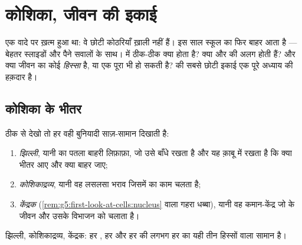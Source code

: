 \chapter{कोशिका, जीवन की इकाई}\label{ch:g6:cell-unit-of-life}

 एक वादे पर ख़त्म हुआ था: वे छोटी
कोठरियाँ ख़ाली नहीं हैं। इस साल स्कूल का  फिर बाहर आता है
--- बेहतर स्लाइडों और पैने सवालों के साथ।  में ठीक-ठीक क्या होता
है? क्या  और  की  अलग होती हैं? और क्या  जीवन का
कोई \emph{हिस्सा} है, या एक  पूरा  भी हो सकती है?
 की सबसे छोटी इकाई एक पूरे अध्याय की हक़दार है।

\section{कोशिका के भीतर}

\begin{definition}[कोशिका के भाग]\label{def:g6:cell-unit-of-life:parts}
ठीक से देखो तो हर  वही बुनियादी साज़-सामान दिखाती है:
\begin{enumerate}
  \item \emph{झिल्ली}, यानी  का पतला बाहरी लिफ़ाफ़ा,
        जो उसे बाँधे रखता है और यह क़ाबू में रखता है कि क्या भीतर आए और
        क्या बाहर जाए;
  \item \emph{कोशिकाद्रव्य}, यानी वह लसलसा भराव
        जिसमें  का काम चलता है;
  \item \emph{केंद्रक}
        (\cref{rem:g5:first-look-at-cells:nucleus} वाला गहरा धब्बा),
        यानी वह कमान-केंद्र जो  के जीवन और उसके विभाजन को चलाता
        है।
\end{enumerate}
झिल्ली, कोशिकाद्रव्य, केंद्रक: हर , हर  और हर  की लगभग हर
 का यही तीन हिस्सों वाला सामान है।
\end{definition}

